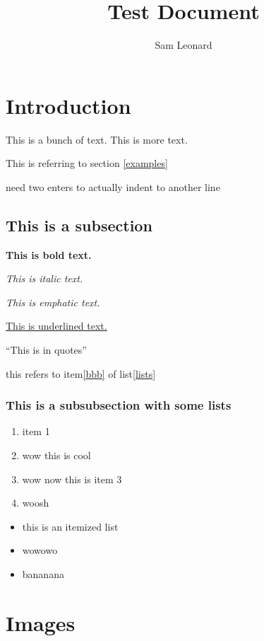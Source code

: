 \documentclass[titlepage]{article}
\author{Sam Leonard}
\title{Test Document}
\date{}
\begin{document}
\maketitle

\section{Introduction}

This is a bunch of text.
This is more text.

This is referring to section \ref{examples}

need two enters to actually indent to another line
\subsection{This is a subsection\label{examples}}

\textbf{This is bold text.}

\textit{This is italic text.}

\emph{This is emphatic text.}

\underline{This is underlined text.}

``This is in quotes''

this refers to item\ref{bbb} of list\ref{lists}

\subsubsection{This is a subsubsection with some lists}

\begin{enumerate}\label{lists}
  \item item 1
  \item wow this is cool
  \item wow now this is item 3
  \item woosh\label{bbb}

\end{enumerate}

\begin{itemize}

  \item this is an itemized list
  \item wowowo
  \item bananana

\end{itemize}

\section{Images}
\end{document}
